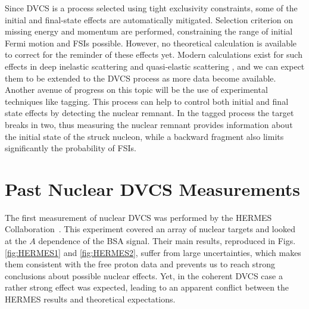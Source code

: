 \documentclass[aps,prc,preprint,superscriptaddress]{revtex4}
\begin{document}
Since DVCS is a 
process selected using tight exclusivity constraints, some of the initial and final-state effects are
automatically mitigated. Selection criterion on missing energy and momentum are performed,
constraining the range of initial Fermi motion and FSIs possible. However, no theoretical
calculation is available to correct for the reminder of these effects yet. Modern calculations exist 
for such effects in deep inelastic scattering \cite{Cosyn:2017ekf} and quasi-elastic 
scattering \cite{Ethier:2014bua}, and we can expect them to be extended to the DVCS 
process as more data become available. Another avenue of progress
on this topic will be the use of experimental techniques like tagging. This process
can help to control both initial and final state effects by detecting the nuclear remnant.
In the tagged process the target breaks in two, thus measuring the nuclear remnant provides 
information about the initial state of the struck nucleon, while a backward fragment also 
limits significantly the probability of FSIs.

\section{Past Nuclear DVCS Measurements}

The first measurement of nuclear DVCS was performed by the HERMES 
Collaboration~\cite{Airapetian:2009cga}. This experiment covered an array of 
nuclear targets and looked at the $A$ dependence of the
BSA signal. Their main results, reproduced in Figs. \ref{fig:HERMES1} and \ref{fig:HERMES2}, suffer
from large uncertainties, which makes them consistent with the free proton data and prevents us to
reach strong conclusions about possible nuclear effects. Yet, in the coherent DVCS case a rather
strong effect was expected, leading to an apparent conflict between the HERMES results and theoretical
expectations. 
\end{document}
